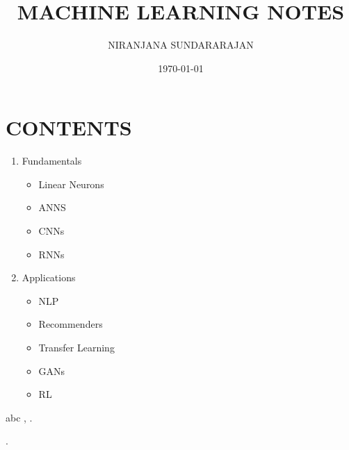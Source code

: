 \documentclass[twoside,twocolumn]{article}
\title{MACHINE LEARNING NOTES} %
\author{%
\textsc{NIRANJANA SUNDARARAJAN}
}
\date{\today} %
\begin{document}
\maketitle


\section{CONTENTS}
\begin{enumerate}
\item Fundamentals
\begin{itemize}
\item Linear Neurons
\item ANNS
\item CNNs
\item RNNs 
\end{itemize}
\item Applications
 \begin{itemize}
    \item NLP
    \item Recommenders
    \item Transfer Learning
    \item GANs
    \item RL
    \end{itemize}

\end{enumerate}



\begin{thebibliography}{99} 
\bibitem[1]{}abc
, .
 
 \bibitem[2]{}.


\end{thebibliography}

\end{document}
